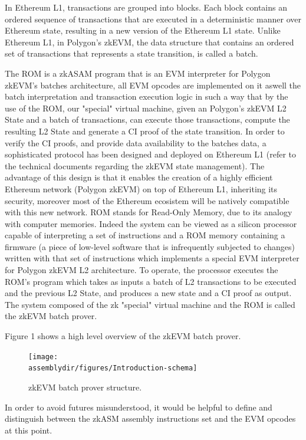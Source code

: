 In Ethereum L1, transactions are grouped into blocks. Each block contains an ordered sequence of transactions that are executed in a deterministic manner over Ethereum state, resulting in a new version of the Ethereum L1 state. Unlike Ethereum L1, in Polygon's zkEVM, the data structure that contains an ordered set of transactions that represents a state transition, is called a batch.

The ROM is a zkASAM program that is an EVM interpreter for Polygon zkEVM's batches architecture, all EVM opcodes are implemented on it aswell the batch interpretation and transaction execution logic in such a way that by the use of the ROM, our "special" virtual machine, given an Polygon's zkEVM L2 State and a batch of transactions, can execute those transactions, compute the resulting L2 State and generate a CI proof of the state transition. In order to verify the CI proofs, and provide data availability to the batches data, a sophisticated protocol has been designed and deployed on Ethereum L1 (refer to the technical documents regarding the zkEVM state management). The advantage of this design is that it enables the creation of a highly efficient Ethereum network (Polygon zkEVM) on top of Ethereum L1, inheriting its security, moreover most of the Ethereum ecosistem will be natively compatible with this new network. ROM stands for Read-Only Memory, due to its analogy with computer memories. Indeed the system can be viewed as a silicon processor capable of interpreting a set of instructions and a ROM memory containing a firmware (a piece of low-level software that is infrequently subjected to changes) written with that set of instructions which implements a special EVM interpreter for Polygon zkEVM L2 architecture. To operate, the processor executes the ROM's program which takes as inputs a batch of L2 transactions to be executed and the previous L2 State, and produces a new state and a CI proof as output. The system composed of the zk "special" virtual machine and the ROM is called the zkEVM batch prover.

Figure 1 shows a high level overview of the zkEVM batch prover.

\begin{figure}[H]
    \centering
    \texttt{[image: \\assemblydir/figures/Introduction-schema]}
    \caption{zkEVM batch prover structure.}
    \label{fig:hashk-add-bytes}
\end{figure}



In order to avoid futures misunderstood, it would be helpful to define and distinguish between the zkASM assembly instructions set and the EVM opcodes at this point.

